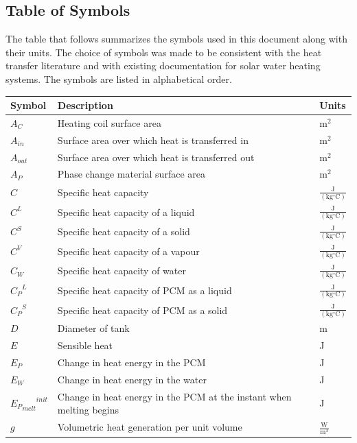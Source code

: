 \documentclass[12pt]{article}
\begin{document}
\subsection{Table of Symbols}
\label{Sec:ToS}
The table that follows summarizes the symbols used in this document along with their units. The choice of symbols was made to be consistent with the heat transfer literature and with existing documentation for solar water heating systems. The symbols are listed in alphabetical order.
\begin{longtabu}{l X[l] l}
\toprule
Symbol & Description & Units
\\
\midrule
${A_{C}}$ & Heating coil surface area & $\text{m}^{2}$
\\
${A_{in}}$ & Surface area over which heat is transferred in & $\text{m}^{2}$
\\
${A_{out}}$ & Surface area over which heat is transferred out & $\text{m}^{2}$
\\
${A_{P}}$ & Phase change material surface area & $\text{m}^{2}$
\\
$C$ & Specific heat capacity & $\frac{\text{J}}{(\text{kg}{}^{\circ}\text{C})}$
\\
${C^{L}}$ & Specific heat capacity of a liquid & $\frac{\text{J}}{(\text{kg}{}^{\circ}\text{C})}$
\\
${C^{S}}$ & Specific heat capacity of a solid & $\frac{\text{J}}{(\text{kg}{}^{\circ}\text{C})}$
\\
${C^{V}}$ & Specific heat capacity of a vapour & $\frac{\text{J}}{(\text{kg}{}^{\circ}\text{C})}$
\\
${C_{W}}$ & Specific heat capacity of water & $\frac{\text{J}}{(\text{kg}{}^{\circ}\text{C})}$
\\
${{C_{P}}^{L}}$ & Specific heat capacity of PCM as a liquid & $\frac{\text{J}}{(\text{kg}{}^{\circ}\text{C})}$
\\
${{C_{P}}^{S}}$ & Specific heat capacity of PCM as a solid & $\frac{\text{J}}{(\text{kg}{}^{\circ}\text{C})}$
\\
$D$ & Diameter of tank & m
\\
$E$ & Sensible heat & J
\\
${E_{P}}$ & Change in heat energy in the PCM & J
\\
${E_{W}}$ & Change in heat energy in the water & J
\\
${{{E_{P}}_{melt}}^{init}}$ & Change in heat energy in the PCM at the instant when melting begins & J
\\
$g$ & Volumetric heat generation per unit volume & $\frac{\text{W}}{\text{m}^{3}}$

\end{longtabu}
\end{document}
